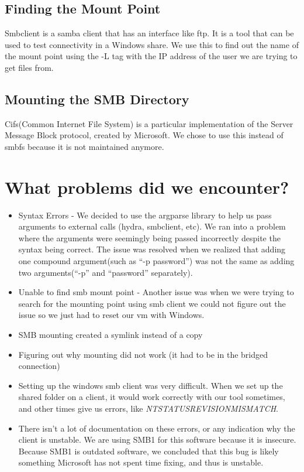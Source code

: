 \documentclass[a4paper]{article}
\begin{document}
\subsection{Finding the Mount Point}
Smbclient is a samba client that has an interface like ftp. It is a tool that can be used to test connectivity in a Windows share. We use this to find out the name of the mount point using the -L tag with the IP address of the user we are trying to get files from.

\subsection{Mounting the SMB Directory}
Cifs(Common Internet File System) is a particular implementation of the Server Message Block protocol, created by Microsoft. We chose to use this instead of smbfs because it is not maintained anymore. 

\section{What problems did we encounter?}
\begin{itemize}
\item Syntax Errors - We decided to use the argparse library to help us pass arguments to external calls (hydra, smbclient, etc).  We ran into a problem where the arguments were seemingly being passed incorrectly despite the syntax being correct.  The issue was resolved when we realized that adding one compound argument(such as “-p password”) was not the same as adding two arguments(“-p” and “password” separately).
\item Unable to find smb mount point - Another issue was when we were trying to search for the mounting point using smb client we could not figure out the issue so we just had to reset our vm with Windows.
\item SMB mounting created a symlink instead of a copy
\item Figuring out why mounting did not work (it had to be in the bridged connection)
\item Setting up the windows smb client was very difficult. When we set up the shared folder on a client, it would work correctly with our tool sometimes, and other times give us errors, like \textit{NT\textunderscore STATUS\textunderscore REVISION\textunderscore MISMATCH}.
\item  There isn’t a lot of documentation on these errors, or any indication why the client is unstable. We are using SMB1 for this software because it is insecure. Because SMB1 is outdated software, we concluded that this bug is likely something Microsoft has not spent time fixing, and thus is unstable. 
\end{itemize}
\end{document}
